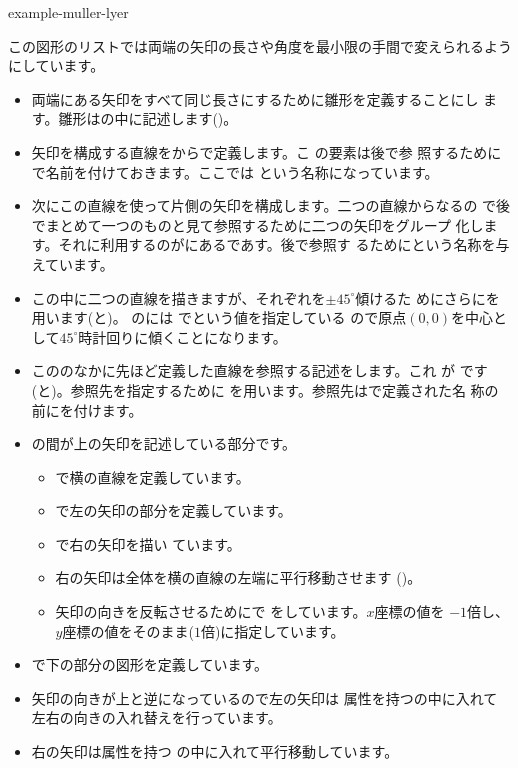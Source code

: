 {example-muller-lyer}

この図形のリストでは両端の矢印の長さや角度を最小限の手間で変えられるよう
にしています。
{}
\begin{itemize}
 \item 両端にある矢印をすべて同じ長さにするために雛形を定義することにし
       ます。雛形はの中に記述します()。
 \item 矢印を構成する直線をからで定義します。こ
       の要素は後で参
       照するためにで名前を付けておきます。ここでは
       という名称になっています。
 \item 次にこの直線を使って片側の矢印を構成します。二つの直線からなるの
       で後でまとめて一つのものと見て参照するために二つの矢印をグループ
       化します。それに利用するのがにあるであす。後で参照す
       るためにという名称を与えています。
 \item この中に二つの直線を描きますが、それぞれを$\pm45^{\circ}$傾けるた
       めにさらにを用います(と)。
       のには 
       でという値を指定している
       ので原点$(0,0)$を中心として$45^{\circ}$時計回りに傾くことになります。
 \item こののなかに先ほど定義した直線を参照する記述をします。これ
       が  です(と)。参照先を指定するために
       を用います。参照先はで定義された名
       称の前に\AttribVal{\#}{}を付けます。
 \item {}の間が上の矢印を記述している部分です。
\begin{itemize}
 \item {}で横の直線を定義しています。
 \item {}で左の矢印の部分を定義しています。
 \item {}で右の矢印を描い
       ています。
 \item 右の矢印は全体を横の直線の左端に平行移動させます
       ()。
 \item 矢印の向きを反転させるためにで
       をしています。$x$座標の値を
       $-1$倍し、$y$座標の値をそのまま($1$倍)に指定しています。
\end{itemize}
 \item {}で下の部分の図形を定義しています。
 \item 矢印の向きが上と逆になっているので左の矢印は
       属性を持つの中に入れて
       左右の向きの入れ替えを行っています。
 \item 右の矢印は属性を持つ
       の中に入れて平行移動しています。
\end{itemize}

